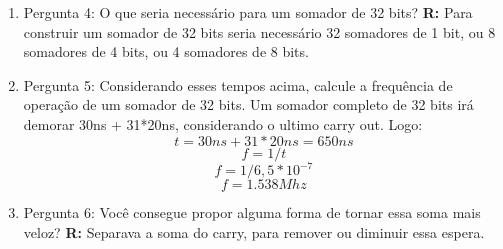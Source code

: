 \documentclass[a4paper,11pt]{article}
\begin{document}
\begin{enumerate}
\begin{enumerate}
            \item{Pergunta 4: O que seria necessário para um somador de 32 bits?}
                \newline
                \textbf{R:} Para construir um somador de 32 bits seria necessário 32 somadores de 1 bit, ou 8 somadores de 4 bits, ou 4 somadores de 8 bits.
                \bigskip
            \item{Pergunta 5: Considerando esses tempos acima, calcule a frequência de operação de um somador
                    de 32 bits.}
                \newline 
                Um somador completo de 32 bits irá demorar 30ns + 31*20ns, considerando o ultimo carry out.
                Logo:
                $$ t = 30ns + 31 * 20ns = 650ns $$
                $$ f = 1 / t $$
                $$ f = 1 / 6,5 * 10^{-7} $$
                $$ f = 1.538 Mhz $$
                \bigskip
            \item{Pergunta 6: Você consegue propor alguma forma de tornar essa soma mais veloz?}
                \newline
                \textbf{R:} Separava a soma do carry, para remover ou diminuir essa espera.
                \bigskip
        \end{enumerate}
\end{enumerate}
\end{document}
